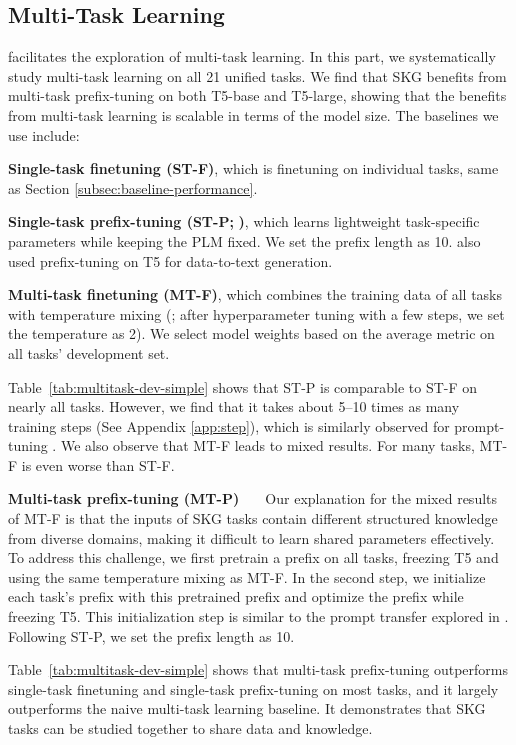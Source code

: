 \documentclass[11pt]{article}
\newcommand{\skg}{SKG\xspace}
\newcommand{\ntasks}{21\xspace}
\begin{document}
\subsection{Multi-Task Learning}
\uskg facilitates the exploration of multi-task learning. In this part, we systematically study multi-task learning on all \ntasks unified tasks. We find that \skg benefits from multi-task prefix-tuning on both T5-base and T5-large, showing that the benefits from multi-task learning is scalable in terms of the model size. The baselines we use include:

\noindent\textbf{Single-task finetuning (ST-F)}, which is finetuning on individual tasks, same as Section \ref{subsec:baseline-performance}.

\noindent\textbf{Single-task prefix-tuning (ST-P;} \citealp{li2021prefixtuning}\textbf{)}, which learns lightweight task-specific parameters while keeping the PLM fixed. We set the prefix length as 10. \citet{Clive2021ControlPF} also used prefix-tuning on T5 for data-to-text generation. 

\noindent\textbf{Multi-task finetuning (MT-F)}, which combines the training data of all tasks with temperature mixing (\citealp{2020t5}; after hyperparameter tuning with a few steps, we set the temperature as 2). We select model weights based on the average metric on all tasks' development set.

Table~\ref{tab:multitask-dev-simple} shows that ST-P is comparable to ST-F on nearly all tasks. 
However, we find that it takes about 5--10 times as many training steps (See Appendix \ref{app:step}), which is similarly observed for prompt-tuning \cite{LesterAC21}. 
We also observe that MT-F leads to mixed results. 
For many tasks, MT-F is even worse than ST-F.


\noindent\textbf{Multi-task prefix-tuning (MT-P) \ \ } 
Our explanation for the mixed results of MT-F is that the inputs of SKG tasks contain different structured knowledge from diverse domains, making it difficult to learn shared parameters effectively. 
To address this challenge, we first pretrain a prefix on all tasks, freezing T5 and using the same temperature mixing as MT-F. In the second step, we initialize each task's prefix with this pretrained prefix and optimize the prefix while freezing T5. 
This initialization step is similar to the prompt transfer explored in \citet{vu2021spot}.
Following ST-P, we set the prefix length as 10. 

Table~\ref{tab:multitask-dev-simple} shows that multi-task prefix-tuning outperforms single-task finetuning and single-task prefix-tuning on most tasks, and it largely outperforms the naive multi-task learning baseline.
It demonstrates that SKG tasks can be studied together to share data and knowledge.
\end{document}
